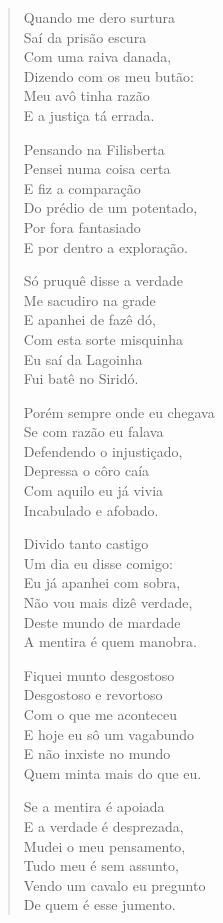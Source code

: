 \begin{verse}
Quando me dero surtura\\
Saí da prisão escura\\
Com uma raiva danada,\\
Dizendo com os meu butão:\\
Meu avô tinha razão\\
E a justiça tá errada.

Pensando na Filisberta\\
Pensei numa coisa certa\\
E fiz a comparação\\
Do prédio de um potentado,\\
Por fora fantasiado\\
E por dentro a exploração.

Só pruquê disse a verdade\\
Me sacudiro na grade\\
E apanhei de fazê dó,\\
Com esta sorte misquinha\\
Eu saí da Lagoinha\\
Fui batê no Siridó.

Porém sempre onde eu chegava\\
Se com razão eu falava\\
Defendendo o injustiçado,\\
Depressa o côro caía\\
Com aquilo eu já vivia\\
Incabulado e afobado.

Divido tanto castigo\\
Um dia eu disse comigo:\\
Eu já apanhei com sobra,\\
Não vou mais dizê verdade,\\
Deste mundo de mardade\\
A mentira é quem manobra.

Fiquei munto desgostoso\\
Desgostoso e revortoso\\
Com o que me aconteceu\\
E hoje eu sô um vagabundo\\
E não inxiste no mundo\\
Quem minta mais do que eu.

Se a mentira é apoiada\\
E a verdade é desprezada,\\
Mudei o meu pensamento,\\
Tudo meu é sem assunto,\\
Vendo um cavalo eu pregunto\\
De quem é esse jumento.


\end{verse}
